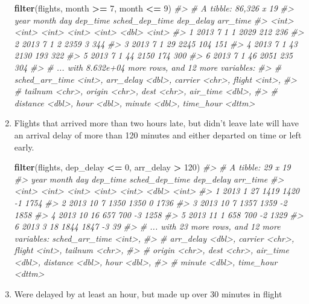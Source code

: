 \documentclass[]{book}
\newenvironment{Shaded}{\begin{snugshade}}{\end{snugshade}}
\newcommand{\CommentTok}[1]{\textcolor[rgb]{0.56,0.35,0.01}{\textit{#1}}}
\newcommand{\DecValTok}[1]{\textcolor[rgb]{0.00,0.00,0.81}{#1}}
\newcommand{\KeywordTok}[1]{\textcolor[rgb]{0.13,0.29,0.53}{\textbf{#1}}}
\newcommand{\NormalTok}[1]{#1}
\newcommand{\OperatorTok}[1]{\textcolor[rgb]{0.81,0.36,0.00}{\textbf{#1}}}
\newcommand{\StringTok}[1]{\textcolor[rgb]{0.31,0.60,0.02}{#1}}
\theoremstyle{plain}
\theoremstyle{remark}
\begin{document}
\begin{enumerate}
\begin{Shaded}
\begin{Highlighting}[]
\KeywordTok{filter}\NormalTok{(flights, month }\OperatorTok{>=}\StringTok{ }\DecValTok{7}\NormalTok{, month }\OperatorTok{<=}\StringTok{ }\DecValTok{9}\NormalTok{)}
\CommentTok{#> # A tibble: 86,326 x 19}
\CommentTok{#>    year month   day dep_time sched_dep_time dep_delay arr_time}
\CommentTok{#>   <int> <int> <int>    <int>          <int>     <dbl>    <int>}
\CommentTok{#> 1  2013     7     1        1           2029       212      236}
\CommentTok{#> 2  2013     7     1        2           2359         3      344}
\CommentTok{#> 3  2013     7     1       29           2245       104      151}
\CommentTok{#> 4  2013     7     1       43           2130       193      322}
\CommentTok{#> 5  2013     7     1       44           2150       174      300}
\CommentTok{#> 6  2013     7     1       46           2051       235      304}
\CommentTok{#> # ... with 8.632e+04 more rows, and 12 more variables:}
\CommentTok{#> #   sched_arr_time <int>, arr_delay <dbl>, carrier <chr>, flight <int>,}
\CommentTok{#> #   tailnum <chr>, origin <chr>, dest <chr>, air_time <dbl>,}
\CommentTok{#> #   distance <dbl>, hour <dbl>, minute <dbl>, time_hour <dttm>}
\end{Highlighting}
\end{Shaded}
\item
  Flights that arrived more than two hours late, but didn't leave late
  will have an arrival delay of more than 120 minutes and either
  departed on time or left early.

\begin{Shaded}
\begin{Highlighting}[]
\KeywordTok{filter}\NormalTok{(flights, dep_delay }\OperatorTok{<=}\StringTok{ }\DecValTok{0}\NormalTok{, arr_delay }\OperatorTok{>}\StringTok{ }\DecValTok{120}\NormalTok{)}
\CommentTok{#> # A tibble: 29 x 19}
\CommentTok{#>    year month   day dep_time sched_dep_time dep_delay arr_time}
\CommentTok{#>   <int> <int> <int>    <int>          <int>     <dbl>    <int>}
\CommentTok{#> 1  2013     1    27     1419           1420        -1     1754}
\CommentTok{#> 2  2013    10     7     1350           1350         0     1736}
\CommentTok{#> 3  2013    10     7     1357           1359        -2     1858}
\CommentTok{#> 4  2013    10    16      657            700        -3     1258}
\CommentTok{#> 5  2013    11     1      658            700        -2     1329}
\CommentTok{#> 6  2013     3    18     1844           1847        -3       39}
\CommentTok{#> # ... with 23 more rows, and 12 more variables: sched_arr_time <int>,}
\CommentTok{#> #   arr_delay <dbl>, carrier <chr>, flight <int>, tailnum <chr>,}
\CommentTok{#> #   origin <chr>, dest <chr>, air_time <dbl>, distance <dbl>, hour <dbl>,}
\CommentTok{#> #   minute <dbl>, time_hour <dttm>}
\end{Highlighting}
\end{Shaded}
\item
  Were delayed by at least an hour, but made up over 30 minutes in
  flight


\end{enumerate}
\end{document}
